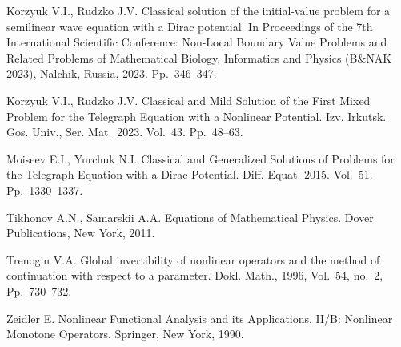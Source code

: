 \documentclass[12pt]{llncs}
\begin{document}
\begin{thebibliography}{9} %

 Korzyuk V.I., Rudzko J.V. Classical solution of the initial-value problem for a semilinear wave equation with a Dirac potential. In Proceedings of the 7th International Scientific Conference: Non-Local Boundary Value Problems and Related Problems of Mathematical Biology, Informatics and Physics (B{\&}NAK 2023), Nalchik, Russia, 2023. Pp.~346--347.

 Korzyuk V.I., Rudzko J.V. Classical and Mild Solution of the First Mixed Problem for the Telegraph Equation with a Nonlinear Potential. Izv. Irkutsk. Gos. Univ., Ser. Mat.~2023. Vol.~43. Pp.~48--63. 

 Moiseev E.I., Yurchuk N.I. Classical and Generalized Solutions of Problems for the Telegraph Equation with a Dirac Potential. Diff. Equat. 2015. Vol.~51. Pp.~1330--1337.

 Tikhonov A.N., Samarskii A.A. Equations of Mathematical Physics. Dover Publications, New York, 2011.

 Trenogin V.A. Global invertibility of nonlinear operators and the method of continuation with respect to a parameter. Dokl. Math., 1996, Vol.~54, no.~2, Pp.~730--732.

 Zeidler E. Nonlinear Functional Analysis and its Applications. II/B: Nonlinear Monotone Operators. Springer, New York, 1990. 







\end{thebibliography}

\end{document}
